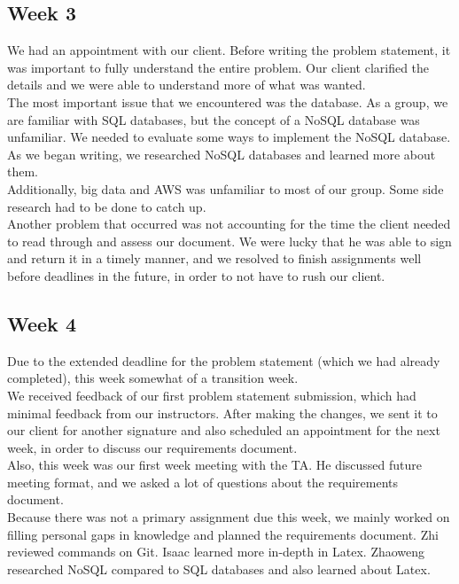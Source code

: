 \subsection{Week 3}
We had an appointment with our client. Before writing the problem statement, it was important to fully understand the entire problem. Our client clarified the details and we were able to understand more of what was wanted. \\

\noindent The most important issue that we encountered was the database. As a group, we are familiar with SQL databases, but the concept of a NoSQL database was unfamiliar. We needed to evaluate some ways to implement the NoSQL database. As we began writing, we researched NoSQL databases and learned more about them. \\
    
\noindent Additionally, big data and AWS was unfamiliar to most of our group. Some side research had to be done to catch up. \\
    
\noindent Another problem that occurred was not accounting for the time the client needed to read through and assess our document. We were lucky that he was able to sign and return it in a timely manner, and we resolved to finish assignments well before deadlines in the future, in order to not have to rush our client.

\subsection{Week 4}
\noindent Due to the extended deadline for the problem statement (which we had already completed), this week somewhat of a transition week.\\
    
\noindent We received feedback of our first problem statement submission, which had minimal feedback from our instructors. After making the changes, we sent it to our client for another signature and also scheduled an appointment for the next week, in order to discuss our requirements document.\\
    
\noindent Also, this week was our first week meeting with the TA. He discussed future meeting format, and we asked a lot of questions about the requirements document.\\
    
\noindent Because there was not a primary assignment due this week, we mainly worked on filling personal gaps in knowledge and planned the requirements document. Zhi reviewed commands on Git. Isaac learned more in-depth in Latex. Zhaoweng researched NoSQL compared to SQL databases and also learned about Latex.

